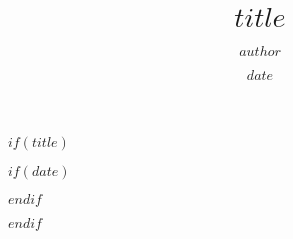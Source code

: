 $if(title)$
  \title{$title$}
  \author{$author$}

  $if(date)$
    \date{$date$}
  $endif$

  \maketitle
$endif$

